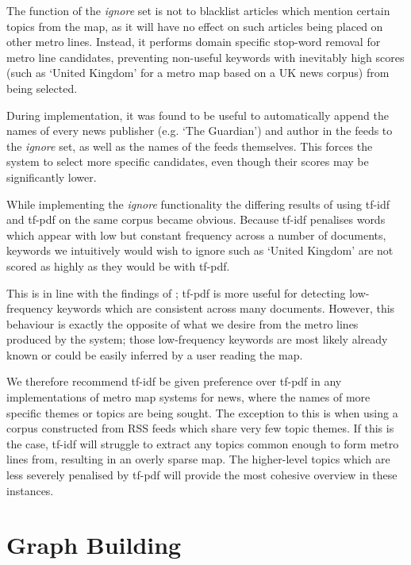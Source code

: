 The function of the \textit{ignore} set is not to blacklist articles which mention certain topics from the map, as it will have no effect on such articles being placed on other metro lines. Instead, it performs domain specific stop-word removal for metro line candidates, preventing non-useful keywords with inevitably high scores (such as `United Kingdom' for a metro map based on a UK news corpus) from being selected. 

During implementation, it was found to be useful to automatically append the names of every news publisher (e.g. `The Guardian') and author in the feeds to the \textit{ignore} set, as well as the names of the feeds themselves. This forces the system to select more specific candidates, even though their scores may be significantly lower.

While implementing the \textit{ignore} functionality the differing results of using tf-idf and tf-pdf on the same corpus became obvious. Because tf-idf penalises words which appear with low but constant frequency across a number of documents, keywords we intuitively would wish to ignore such as `United Kingdom' are not scored as highly as they would be with tf-pdf. 

This is in line with the findings of \citeauthor{TopicExtractionfromnewsArchiveUsingTFPDFAlgorithm}; tf-pdf is more useful for detecting low-frequency keywords which are consistent across many documents. However, this behaviour is exactly the opposite of what we desire from the  metro lines produced by the system; those low-frequency keywords are most likely already known or could be easily inferred by a user reading the map. 

We therefore recommend tf-idf be given preference over tf-pdf in any implementations of metro map systems for news, where the names of more specific themes or topics are being sought. The exception to this is when using a corpus constructed from RSS feeds which share very few topic themes. If this is the case, tf-idf will struggle to extract any topics common enough to form metro lines from, resulting in an overly sparse map. The higher-level topics which are less severely penalised by tf-pdf will provide the most cohesive overview in these instances.

\clearpage

\section{Graph Building} 

